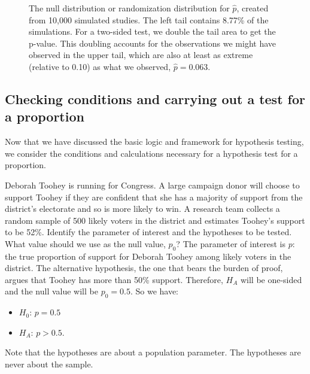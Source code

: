 \begin{figure}[ht]
\centering
{}
\caption{The null distribution or randomization distribution for $\hat{p}$, created from 10,000 simulated studies. The left tail contains 8.77\% of the simulations. For a two-sided test, we double the tail area to get the p-value. This doubling accounts for the observations we might have observed in the upper tail, which are also at least as extreme (relative to 0.10) as what we observed, $\hat{p} = 0.063$.}
\label{MedConsNullSim}
\end{figure}

\newpage
\subsection{Checking conditions and carrying out a test for a proportion}

Now that we have discussed the basic logic and framework for hypothesis testing, we consider the conditions and calculations necessary for a hypothesis test for a proportion.

\begin{examplewrap}
\begin{nexample}{Deborah Toohey is running for Congress.  A large campaign donor will choose to support Toohey if they are confident that she has a majority of support from the district's electorate and so is more likely to win.   A research team collects a random sample of 500 likely voters in the district and estimates Toohey's support to be 52\%.  Identify the parameter of interest and the hypotheses to be tested. What value should we use as the null value, $p_{0}$?}
\label{TooheyTestNameAndConditionExample}
The parameter of interest is $p$:  the true proportion of support for Deborah Toohey among likely voters in the district.  The alternative hypothesis, the one that bears the burden of proof, argues that Toohey has more than 50\% support. Therefore, $H_A$ will be one-sided and the null value will be $p_0 = 0.5$. So we have:
\begin{itemize}
\item[] $H_0$: $p = 0.5$
\item[] $H_A$: $p > 0.5$. 
\end{itemize}
Note that the hypotheses are about a population parameter.  The hypotheses are never about the sample.
\end{nexample}
\end{examplewrap}

